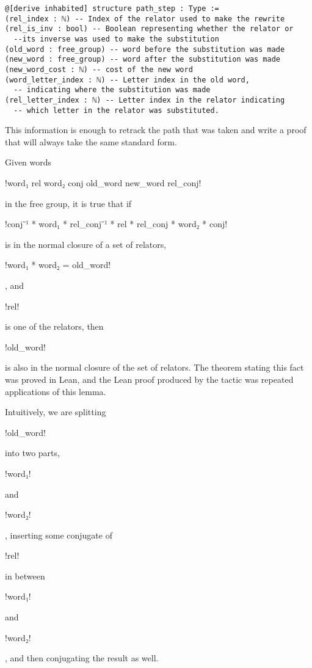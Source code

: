 \documentclass[12pt]{article} %
\theoremstyle{definition}
\theoremstyle{definition}
\theoremstyle{definition}
\theoremstyle{definition}
\begin{document}
\begin{lstlisting}
@[derive inhabited] structure path_step : Type :=
(rel_index : ℕ) -- Index of the relator used to make the rewrite
(rel_is_inv : bool) -- Boolean representing whether the relator or
  --its inverse was used to make the substitution
(old_word : free_group) -- word before the substitution was made
(new_word : free_group) -- word after the substitution was made
(new_word_cost : ℕ) -- cost of the new word
(word_letter_index : ℕ) -- Letter index in the old word,
  -- indicating where the substitution was made
(rel_letter_index : ℕ) -- Letter index in the relator indicating
  -- which letter in the relator was substituted.
\end{lstlisting}

This information is enough to retrack the path that was taken and write a
proof that will always take the same standard form.

Given words \begin{lstinline} !word₁ rel word₂ conj old_word new_word rel_conj! \end{lstinline}
in the free group, it is true that if
\begin{lstinline} !conj⁻¹ * word₁ * rel_conj⁻¹ * rel * rel_conj * word₂ * conj! \end{lstinline}
is in the normal closure of a set of relators, \begin{lstinline}!word₁ * word₂ = old_word!\end{lstinline},
and \begin{lstinline}!rel!\end{lstinline} is
one of the relators, then \begin{lstinline}!old_word!\end{lstinline} is also in the
normal closure of the set of relators. The theorem stating this fact was proved in Lean,
and the Lean proof produced by the tactic was repeated applications of this lemma.

Intuitively, we are splitting \begin{lstinline}!old_word!\end{lstinline} into two parts,
\begin{lstinline}!word₁!\end{lstinline} and \begin{lstinline}!word₂!\end{lstinline},
inserting some conjugate of \begin{lstinline}!rel!\end{lstinline} in between
\begin{lstinline}!word₁!\end{lstinline} and \begin{lstinline}!word₂!\end{lstinline},
and then conjugating the result as well.
\end{document}
